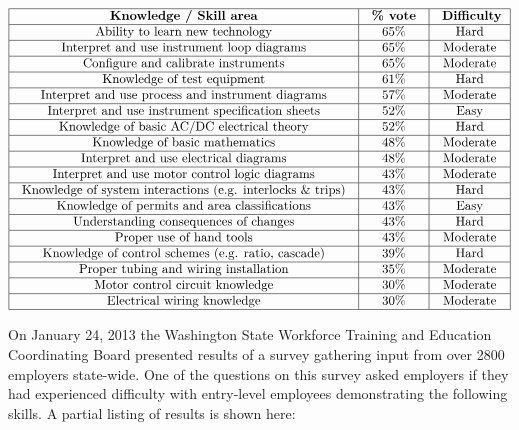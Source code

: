 $$\vbox{\offinterlineskip
\halign{\strut
\vrule \quad\hfil # \ \hfil & 
\vrule \quad\hfil # \ \hfil & 
\vrule \quad\hfil # \ \hfil \vrule \cr
\noalign{\hrule}
%
{\bf Knowledge / Skill area} & {\bf \% vote} & {\bf Difficulty}\cr
%
\noalign{\hrule}
%
Ability to learn new technology & 65\% & Hard \cr
%
\noalign{\hrule}
%
Interpret and use instrument loop diagrams & 65\% & Moderate \cr
%
\noalign{\hrule}
%
Configure and calibrate instruments & 65\% & Moderate \cr
%
\noalign{\hrule}
%
Knowledge of test equipment & 61\% & Hard \cr
%
\noalign{\hrule}
%
Interpret and use process and instrument diagrams & 57\% & Moderate \cr
%
\noalign{\hrule}
%
Interpret and use instrument specification sheets & 52\% & Easy \cr
%
\noalign{\hrule}
%
Knowledge of basic AC/DC electrical theory & 52\% & Hard \cr
%
\noalign{\hrule}
%
Knowledge of basic mathematics & 48\% & Moderate \cr
%
\noalign{\hrule}
%
Interpret and use electrical diagrams & 48\% & Moderate \cr
%
\noalign{\hrule}
%
Interpret and use motor control logic diagrams & 43\% & Moderate \cr
%
\noalign{\hrule}
%
Knowledge of system interactions (e.g. interlocks \& trips) & 43\% & Hard \cr
%
\noalign{\hrule}
%
Knowledge of permits and area classifications & 43\% & Easy \cr
%
\noalign{\hrule}
%
Understanding consequences of changes & 43\% & Hard \cr
%
\noalign{\hrule}
%
Proper use of hand tools & 43\% & Moderate \cr
%
\noalign{\hrule}
%
Knowledge of control schemes (e.g. ratio, cascade) & 39\% & Hard \cr
%
\noalign{\hrule}
%
Proper tubing and wiring installation & 35\% & Moderate \cr
%
\noalign{\hrule}
%
Motor control circuit knowledge & 30\% & Moderate \cr
%
\noalign{\hrule}
%
Electrical wiring knowledge & 30\% & Moderate \cr
%
\noalign{\hrule}
} %
}$$ %

On January 24, 2013 the Washington State Workforce Training and Education Coordinating Board presented results of a survey gathering input from over 2800 employers state-wide.  One of the questions on this survey asked employers if they had experienced difficulty with entry-level employees demonstrating the following skills.  A partial listing of results is shown here:


